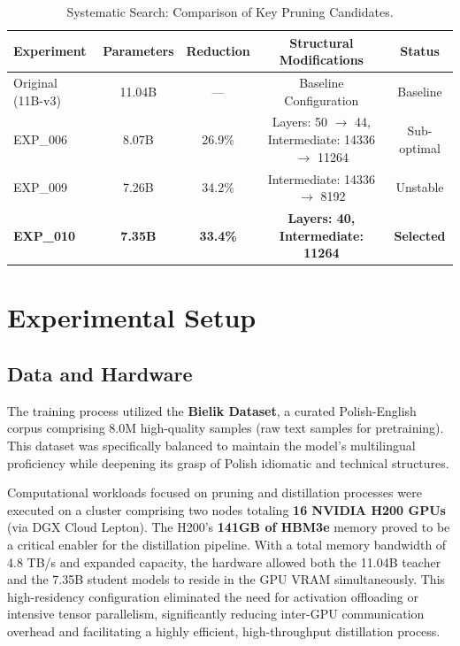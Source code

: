 \documentclass{article}
\begin{document}
\begin{table}[h]
    \centering
    \begin{tabular}{lcccc}
        \toprule
        \textbf{Experiment} & \textbf{Parameters} & \textbf{Reduction} & \textbf{Structural Modifications} & \textbf{Status} \\
        \midrule
        Original (11B-v3) & 11.04B & --- & Baseline Configuration & Baseline \\
        EXP\_006 & 8.07B & 26.9\% & Layers: 50 $\rightarrow$ 44, Intermediate: 14336 $\rightarrow$ 11264 & Sub-optimal \\
        EXP\_009 & 7.26B & 34.2\% & Intermediate: 14336 $\rightarrow$ 8192 & Unstable \\
        \textbf{EXP\_010} & \textbf{7.35B} & \textbf{33.4\%} & \textbf{Layers: 40, Intermediate: 11264} & \textbf{Selected} \\
        \bottomrule
    \end{tabular}
    \caption{Systematic Search: Comparison of Key Pruning Candidates.}
    \label{tab:arch-search}
\end{table}


\section{Experimental Setup}

\subsection{Data and Hardware}
The training process utilized the \textbf{Bielik Dataset}, a curated Polish-English corpus comprising 8.0M high-quality samples (raw text samples for pretraining). This dataset was specifically balanced to maintain the model's multilingual proficiency while deepening its grasp of Polish idiomatic and technical structures.

Computational workloads focused on pruning and distillation processes were executed on a cluster comprising two nodes totaling \textbf{16 NVIDIA H200 GPUs} (via DGX Cloud Lepton). The H200's \textbf{141GB of HBM3e} memory proved to be a critical enabler for the distillation pipeline. With a total memory bandwidth of 4.8 TB/s and expanded capacity, the hardware allowed both the 11.04B teacher and the 7.35B student models to reside in the GPU VRAM simultaneously. This high-residency configuration eliminated the need for activation offloading or intensive tensor parallelism, significantly reducing inter-GPU communication overhead and facilitating a highly efficient, high-throughput distillation process.
\end{document}
